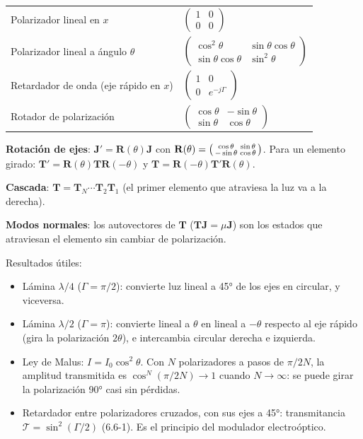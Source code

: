 \documentclass[10pt]{article}
\newcommand{\J}{\mathbf J}
\newcommand{\T}{\mathbf T}
\newcommand{\R}{\mathbf R}
\begin{document}
\begin{clave}[title={Matrices de Jones de los elementos básicos}]
\renewcommand{\arraystretch}{1.6}
\begin{tabular}{@{}ll@{}}
Polarizador lineal en $x$ & $\begin{pmatrix}1&0\\0&0\end{pmatrix}$\\
Polarizador lineal a ángulo $\theta$ & $\begin{pmatrix}\cos^2\theta&\sin\theta\cos\theta\\ \sin\theta\cos\theta&\sin^2\theta\end{pmatrix}$\\
Retardador de onda (eje rápido en $x$) & $\begin{pmatrix}1&0\\0&e^{-j\Gamma}\end{pmatrix}$\\
Rotador de polarización & $\begin{pmatrix}\cos\theta&-\sin\theta\\ \sin\theta&\cos\theta\end{pmatrix}$
\end{tabular}

\textbf{Rotación de ejes}: $\J'=\R(\theta)\J$ con $\R(\theta)=\begin{psmallmatrix}\cos\theta&\sin\theta\\-\sin\theta&\cos\theta\end{psmallmatrix}$. Para un elemento girado: $\T'=\R(\theta)\T\R(-\theta)$ y $\T=\R(-\theta)\T'\R(\theta)$.

\textbf{Cascada}: $\T=\T_N\cdots\T_2\T_1$ (el primer elemento que atraviesa la luz va a la derecha).

\textbf{Modos normales}: los autovectores de $\T$ ($\T\J=\mu\J$) son los estados que atraviesan el elemento sin cambiar de polarización.
\end{clave}
Resultados útiles:
\begin{itemize}
\item Lámina $\lambda/4$ ($\Gamma=\pi/2$): convierte luz lineal a 45° de los ejes en circular, y viceversa.
\item Lámina $\lambda/2$ ($\Gamma=\pi$): convierte lineal a $\theta$ en lineal a $-\theta$ respecto al eje rápido (gira la polarización $2\theta$), e intercambia circular derecha e izquierda.
\item Ley de Malus: $I=I_0\cos^2\theta$. Con $N$ polarizadores a pasos de $\pi/2N$, la amplitud transmitida es $\cos^N(\pi/2N)\to1$ cuando $N\to\infty$: se puede girar la polarización 90° casi sin pérdidas.
\item Retardador entre polarizadores cruzados, con sus ejes a 45°: transmitancia $\mathcal T=\sin^2(\Gamma/2)$ (6.6-1). Es el principio del modulador electroóptico.
\end{itemize}
\end{document}

